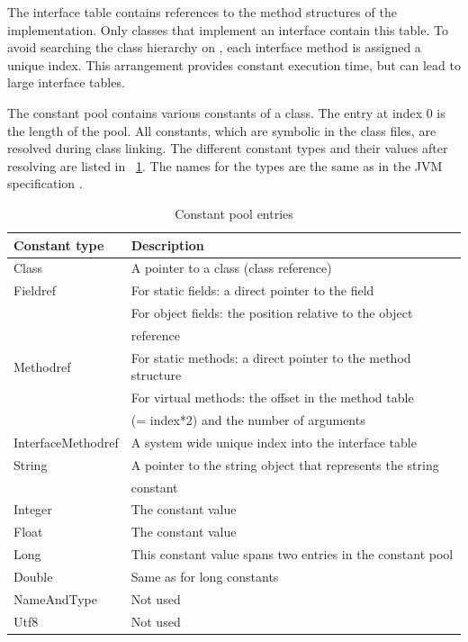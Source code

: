 The interface table contains references to the method structures of
the implementation. Only classes that implement an interface contain
this table. To avoid searching the class hierarchy on
, each interface method is assigned a unique
index. This arrangement provides constant execution time, but can
lead to large interface tables.

The constant pool contains various constants of a class. The entry at
index 0 is the length of the pool. All constants, which are symbolic
in the class files, are resolved during class linking. The different
constant types and their values after resolving are listed in
\tablename~\ref{tab_jvm_const_pool}. The names for the types are the
same as in the JVM specification \cite{jvm}.


\begin{table}[t]
    \centering
    \begin{tabular}{ll}
        \toprule
        Constant type &  Description \\
        \midrule
        Class &  A pointer to a class (class reference) \\
        Fieldref &   For static fields: a direct pointer to the field \\
                &   For object fields: the position relative to the object \\
                & reference \\
        Methodref &  For static methods: a direct pointer to the method structure \\
                & For virtual methods: the offset in the method table \\
                & (= index*2) and the number of arguments \\
        InterfaceMethodref &  A system wide unique index into the interface table \\
        String  & A pointer to the string object that represents the string \\
                & constant \\
        Integer & The constant value \\
        Float   & The constant value \\
        Long    & This constant value spans two entries in the constant pool \\
        Double  & Same as for long constants \\
        NameAndType & Not used \\
        Utf8    & Not used \\
        \bottomrule
    \end{tabular}
    \caption{Constant pool entries}
    \label{tab_jvm_const_pool}
\end{table}

